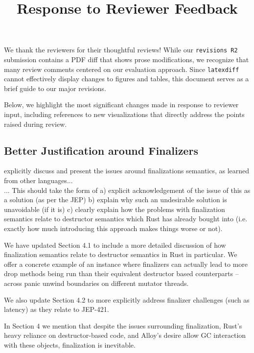 \documentclass[12pt,a4paper,preprint]{article}
\begin{document}
\date{}  %
\title{Response to Reviewer Feedback}
\maketitle

We thank the reviewers for their thoughtful reviews! While our \texttt{revisions R2} submission contains a PDF diff that shows prose modifications, we recognize that many review comments centered on our evaluation approach. Since \texttt{latexdiff} cannot effectively display changes to figures and tables, this document serves as a brief guide to our major revisions.

Below, we highlight the most significant changes made in response to reviewer input, including references to new visualizations that directly address the points raised during review.

\subsection*{Better Justification around Finalizers}

\begin{blockquote}
explicitly discuss and present the issues around finalizations semantics, as learned from other languages...\\

... This should take the form of a) explicit acknowledgement of the issue of this as a solution (as per the JEP) b) explain why such an undesirable solution is unavoidable (if it is) c) clearly explain how the problems with finalization semantics relate to destructor semantics which Rust has already bought into (i.e. exactly how much introducing this approach makes things worse or not).
\end{blockquote}

We have updated Section 4.1 to include a more detailed discussion of how finalization semantics relate to destructor semantics in Rust in particular. We offer a concrete example of an instance where finalizers can actually lead to more drop methods being run than their equivalent destructor based counterparts -- across panic unwind boundaries on different mutator threads.

We also update Section 4.2 to more explicitly address finalizer challenges (such as latency) as they relate to JEP-421.

In Section 4 we mention that despite the issues surrounding finalization, Rust's heavy reliance on destructor-based code, and Alloy's desire allow GC interaction with these objects, finalization is inevitable.
\end{document}
